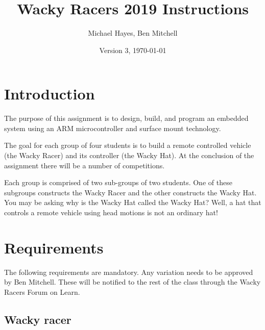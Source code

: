 \documentclass[11pt, a4paper]{article}
\title{Wacky Racers 2019 Instructions}
\author{Michael Hayes, Ben Mitchell}
\date{Version 3, \today}
\begin{document}
\maketitle

\section{Introduction}

The purpose of this assignment is to design, build, and program an
embedded system using an ARM microcontroller and surface mount
technology.

The goal for each group of four students is to build a remote
controlled vehicle (the Wacky Racer) and its controller (the Wacky
Hat).  At the conclusion of the assignment there will be a number of
competitions.

Each group is comprised of two sub-groups of two
students.  One of these subgroups constructs the Wacky Racer and the
other constructs the Wacky Hat.  You may be asking why is the Wacky
Hat called the Wacky Hat?  Well, a hat that controls a remote vehicle
using head motions is not an ordinary hat!


\section{Requirements}

The following requirements are mandatory.  Any variation needs to be
approved by Ben Mitchell.  These will be notified to the rest of the
class through the Wacky Racers Forum on Learn.


\subsection{Wacky racer}
\end{document}
